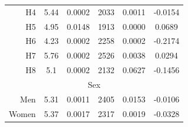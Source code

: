 \begin{table}[h]
\begin{tabular}{rccccc|}
    \multicolumn{1}{|r|}{\cellcolor[HTML]{EFEFEF}H4}         & 5.44                                               & 0.0002                                                & 2033                                                & 0.0011                                            & -0.0154                                               \\
    \multicolumn{1}{|r|}{\cellcolor[HTML]{EFEFEF}H5}         & 4.95                                               & 0.0148                                                & 1913                                                & 0.0000                                            & 0.0689                                                \\
    \multicolumn{1}{|r|}{\cellcolor[HTML]{EFEFEF}H6}         & 4.23                                               & 0.0002                                                & 2258                                                & 0.0002                                            & -0.2174                                               \\
    \multicolumn{1}{|r|}{\cellcolor[HTML]{EFEFEF}H7}         & 5.76                                               & 0.0002                                                & 2526                                                & 0.0038                                            & 0.0294                                                \\
    \multicolumn{1}{|r|}{\cellcolor[HTML]{EFEFEF}H8}         & 5.1                                                & 0.0002                                                & 2132                                                & 0.0627                                            & -0.1456                                               \\ \hline
    \multicolumn{6}{|c|}{\cellcolor[HTML]{BCFBBB}Sex}                                                                                                                                                                                                                                                                                       \\ \hline
    \multicolumn{1}{|r|}{\cellcolor[HTML]{B7FDFA}Men}        & 5.31                                               & 0.0011                                                & 2405                                                & 0.0153                                            & -0.0106                                               \\
    \multicolumn{1}{|r|}{\cellcolor[HTML]{FFBED5}Women}      & 5.37                                               & 0.0017                                                & 2317                                                & 0.0019                                            & -0.0328                                               \\ \hline
    \end{tabular}

    \label{table:networksHS}
    
\end{table}


